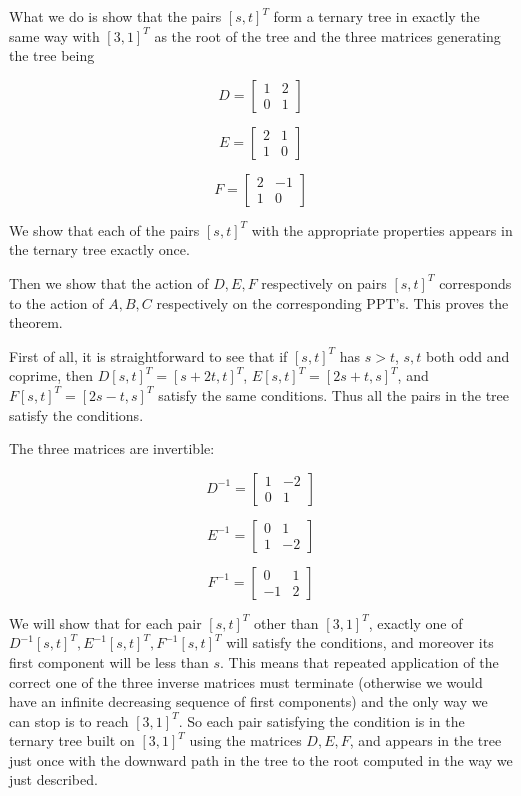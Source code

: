 \documentclass[12pt]{article}
\begin{document}
What we do is show that the pairs $[s,t]^T$ form a ternary tree in exactly the same way with $[3,1]^T$ as the root of the tree and the three matrices generating the tree
being

$$D=\left[\begin{array}{ccc} 1 & 2  \\ 0 & 1 \end{array}\right]$$

$$E=\left[\begin{array}{ccc} 2 & 1\\ 1 & 0 \end{array}\right]$$

$$F=\left[\begin{array}{ccc} 2 & -1 \\ 1 &  0 \end{array}\right]$$

We show that each of the pairs $[s,t]^T$ with the appropriate properties appears in the ternary tree exactly once.

Then we show that the action of $D,E,F$ respectively on pairs $[s,t]^T$ corresponds to the action of $A,B,C$ respectively on the corresponding PPT's.   This proves the theorem.

First of all, it is straightforward to see that if $[s,t]^T$ has $s>t$, $s,t$ both odd and coprime, then $D[s,t]^T = [s+2t,t]^T$,   $E[s,t]^T = [2s+t,s]^T$, and $F[s,t]^T = [2s-t,s]^T$
satisfy the same conditions.   Thus all the pairs in the tree satisfy the conditions.



The three matrices are invertible:  

$$D^{-1}=\left[\begin{array}{ccc} 1 & -2  \\ 0 & 1 \end{array}\right]$$

$$E^{-1}=\left[\begin{array}{ccc} 0 & 1\\ 1 & -2 \end{array}\right]$$

$$F^{-1}=\left[\begin{array}{ccc} 0 & 1 \\ -1 &  2 \end{array}\right]$$

We will show that for each pair $[s,t]^T$ other than $[3,1]^T$, exactly one of $D^{-1}[s,t]^T, E^{-1}[s,t]^T,F^{-1}[s,t]^T$  will satisfy the conditions, and moreover its first component will
be less than $s$.   This means that repeated application of the correct one of the three inverse matrices must terminate (otherwise we would have an infinite decreasing sequence of first components) and the only way we can stop is to reach $[3,1]^T$.   So each pair satisfying the condition is in the ternary tree built on $[3,1]^T$ using the matrices $D,E,F$, and appears in the tree just once with the downward path in the tree to the root computed in the way we just described.
\end{document}

